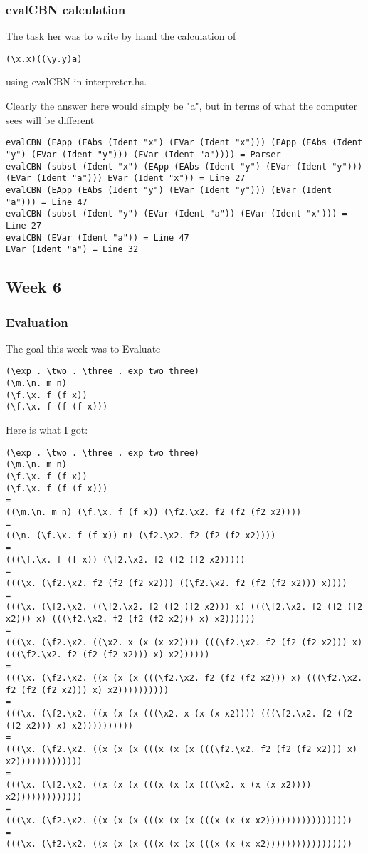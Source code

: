 \documentclass{article}
\theoremstyle{theorem}
\theoremstyle{definition}
\theoremstyle{remark}
\begin{document}
\subsubsection{evalCBN calculation}
The task her was to write by hand the calculation of 
\begin{verbatim}
(\x.x)((\y.y)a)
\end{verbatim}

using evalCBN in interpreter.hs.

Clearly the answer here would simply be "a", but in terms of what the computer sees will be different

\begin{verbatim}
evalCBN (EApp (EAbs (Ident "x") (EVar (Ident "x"))) (EApp (EAbs (Ident "y") (EVar (Ident "y"))) (EVar (Ident "a")))) = Parser
evalCBN (subst (Ident "x") (EApp (EAbs (Ident "y") (EVar (Ident "y"))) (EVar (Ident "a"))) EVar (Ident "x")) = Line 27
evalCBN (EApp (EAbs (Ident "y") (EVar (Ident "y"))) (EVar (Ident "a"))) = Line 47
evalCBN (subst (Ident "y") (EVar (Ident "a")) (EVar (Ident "x"))) = Line 27
evalCBN (EVar (Ident "a")) = Line 47
EVar (Ident "a") = Line 32
\end{verbatim}


\subsection{Week 6}
\subsubsection{Evaluation}
The goal this week was to Evaluate \begin{verbatim}
(\exp . \two . \three . exp two three)
(\m.\n. m n)
(\f.\x. f (f x))
(\f.\x. f (f (f x)))
\end{verbatim}

\noindent\newline\newline Here is what I got:

\begin{verbatim}
(\exp . \two . \three . exp two three)
(\m.\n. m n)
(\f.\x. f (f x))
(\f.\x. f (f (f x)))
=
((\m.\n. m n) (\f.\x. f (f x)) (\f2.\x2. f2 (f2 (f2 x2))))
=
((\n. (\f.\x. f (f x)) n) (\f2.\x2. f2 (f2 (f2 x2))))
=
(((\f.\x. f (f x)) (\f2.\x2. f2 (f2 (f2 x2)))))
=
(((\x. (\f2.\x2. f2 (f2 (f2 x2))) ((\f2.\x2. f2 (f2 (f2 x2))) x))))
=
(((\x. (\f2.\x2. ((\f2.\x2. f2 (f2 (f2 x2))) x) (((\f2.\x2. f2 (f2 (f2 x2))) x) (((\f2.\x2. f2 (f2 (f2 x2))) x) x2))))))
=
(((\x. (\f2.\x2. ((\x2. x (x (x x2)))) (((\f2.\x2. f2 (f2 (f2 x2))) x) (((\f2.\x2. f2 (f2 (f2 x2))) x) x2))))))
=
(((\x. (\f2.\x2. ((x (x (x (((\f2.\x2. f2 (f2 (f2 x2))) x) (((\f2.\x2. f2 (f2 (f2 x2))) x) x2))))))))))
=
(((\x. (\f2.\x2. ((x (x (x (((\x2. x (x (x x2)))) (((\f2.\x2. f2 (f2 (f2 x2))) x) x2))))))))))
=
(((\x. (\f2.\x2. ((x (x (x (((x (x (x (((\f2.\x2. f2 (f2 (f2 x2))) x) x2)))))))))))))
=
(((\x. (\f2.\x2. ((x (x (x (((x (x (x (((\x2. x (x (x x2)))) x2)))))))))))))
=
(((\x. (\f2.\x2. ((x (x (x (((x (x (x (((x (x (x x2)))))))))))))))))
=
(((\x. (\f2.\x2. ((x (x (x (((x (x (x (((x (x (x x2)))))))))))))))))
\end{verbatim}
\end{document}
